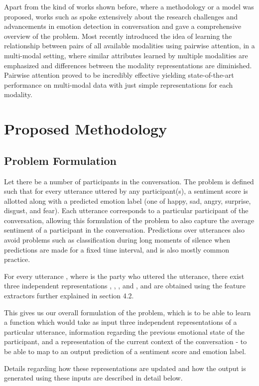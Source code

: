 \documentclass[11pt,a4paper]{article}
\begin{document}
Apart from the kind of works shown before, where a methodology or a model was proposed, works such as \citet{poria3} spoke extensively about the research challenges and advancements in emotion detection in conversation and gave a comprehensive overview of the problem. Most recently \citet{ghosal} introduced the idea of learning the relationship between pairs of all available modalities using pairwise attention, in a multi-modal setting, where similar attributes learned by multiple modalities are emphasized and differences between the modality representations are diminished. Pairwise attention proved to be incredibly effective yielding state-of-the-art performance on multi-modal data with just simple representations for each modality.

\section{Proposed Methodology}
\subsection{Problem Formulation}
Let there be a  number of participants   in the conversation. The problem is defined such that for every utterance   uttered by any participant(s), a sentiment score is allotted along with a predicted emotion label (one of happy, sad, angry, surprise, disgust, and fear). Each utterance corresponds to a particular participant of the conversation, allowing this formulation of the problem to also capture the average sentiment of a participant in the conversation. Predictions over utterances also avoid problems such as classification during long moments of silence when predictions are made for a fixed time interval, and is also mostly common practice. 

For every utterance , where  is the party who uttered the utterance, there exist three independent representations ,  , , and , and are obtained using the feature extractors further explained in section 4.2.

This gives us our overall formulation of the problem, which is to be able to learn a function which would take as input three independent representations of a particular utterance, information regarding the previous emotional state of the participant, and a representation of the current context of the conversation - to be able to map to an output prediction of a sentiment score and emotion label. 

Details regarding how these representations are updated and how the output is generated using these inputs are described in detail below.
\end{document}

